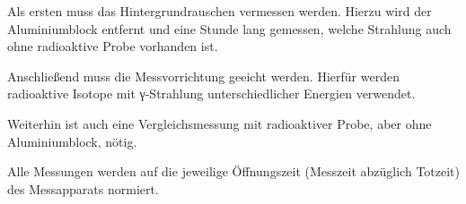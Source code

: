 Als ersten muss das Hintergrundrauschen vermessen werden. Hierzu wird der
Aluminiumblock entfernt und eine Stunde lang gemessen, welche Strahlung auch
ohne radioaktive Probe vorhanden ist.

Anschließend muss die Messvorrichtung geeicht werden. Hierfür werden radioaktive
Isotope mit γ-Strahlung unterschiedlicher Energien verwendet.

Weiterhin ist auch eine Vergleichsmessung mit radioaktiver Probe, aber ohne
Aluminiumblock, nötig.

Alle Messungen werden auf die jeweilige Öffnungszeit (Messzeit abzüglich Totzeit)
des Messapparats normiert.